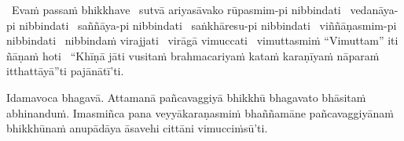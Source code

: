 \begin{pali-hang}
  \anglebracketleft\ \hspace{-0.5mm}Evaṁ passaṁ bhikkhave \hspace{-0.5mm}\anglebracketright\ sutvā ariyasāvako rūpasmim-pi nibbindati \breathmark\ vedanāya-pi nibbindati \breathmark\ saññāya-pi nibbindati \breathmark\ saṅkhāresu-pi nibbindati \breathmark\ viññāṇasmim-pi nibbindati \breathmark\ nibbindaṁ virajjati \breathmark\ virāgā vimuccati \breathmark\ vimuttasmiṁ ``Vimuttam'' iti ñāṇaṁ hoti \breathmark\ ``Khīṇā jāti vusitaṁ brahmacariyaṁ kataṁ karaṇīyaṁ nāparaṁ itthattāyā''ti pajānātī'ti.
\end{pali-hang}

\begin{pali-hang}
  Idamavoca bhagavā. Attamanā pañcavaggiyā bhikkhū bhagavato bhāsitaṁ abhinanduṁ. Imasmiñca pana veyyākaraṇasmiṁ bhaññamāne pañcavaggiyānaṁ bhikkhūnaṁ anupādāya āsavehi cittāni vimucciṁsū'ti.
\end{pali-hang}

\suttaRef{[SN 22.59]}


